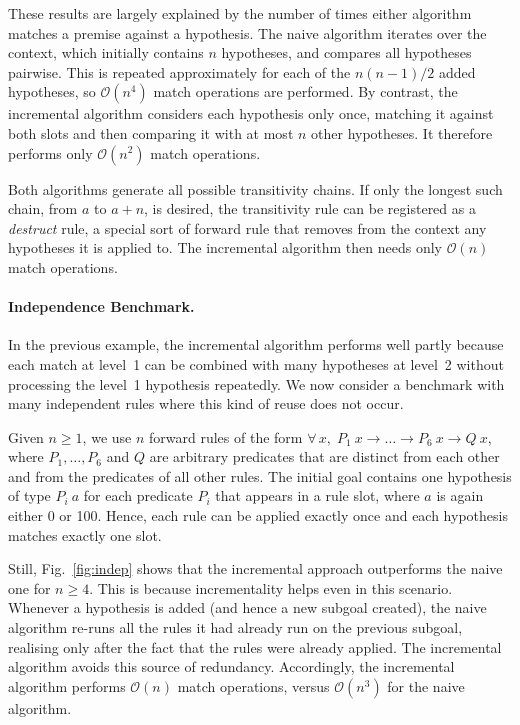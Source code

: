 \documentclass[runningheads,leqno]{llncs}
\newcommand{\para}[1]{\paragraph{\bfseries\upshape #1}}
\newcommand{\All}[2]{\ensuremath{\forall\, #1,\; #2}}
\newcommand{\bigO}{\ensuremath{\mathcal{O}}}
\begin{document}
These results are largely explained by the number of times either algorithm matches a premise against a hypothesis.
The naive algorithm iterates over the context, which initially contains $n$ hypotheses, and compares all hypotheses pairwise.
This is repeated approximately for each of the $n(n-1)/2$ added hypotheses, so $\bigO(n^4)$ match operations are performed.
By contrast, the incremental algorithm considers each hypothesis only once, matching it against both slots and then comparing it with at most $n$ other hypotheses.
It therefore performs only $\bigO(n^2)$ match operations.

Both algorithms generate all possible transitivity chains.
If only the longest such chain, from $a$ to $a + n$, is desired, the transitivity rule can be registered as a \emph{destruct} rule, a special sort of forward rule that removes from the context any hypotheses it is applied to.
The incremental algorithm then needs only $\bigO(n)$ match operations.

\para{Independence Benchmark.}
In the previous example, the incremental algorithm performs well partly because each match at level~1 can be combined with many hypotheses at level~2 without processing the level~1 hypothesis repeatedly.
We now consider a benchmark with many independent rules where this kind of reuse does not occur.

Given $n ≥ 1$, we use $n$ forward rules of the form $\All{x}{P_{1}~x → \dots → P_{6}~x → Q~x}$, where $P_{1}, \dots, P_{6}$ and $Q$ are arbitrary predicates that are distinct from each other and from the predicates of all other rules.
The initial goal contains one hypothesis of type $P_{i}~a$ for each predicate $P_{i}$ that appears in a rule slot, where $a$ is again either 0 or 100.
Hence, each rule can be applied exactly once and each hypothesis matches exactly one slot.

Still, Fig.~\ref{fig:indep} shows that the incremental approach outperforms the naive one for $n ≥ 4$.
This is because incrementality helps even in this scenario.
Whenever a hypothesis is added (and hence a new subgoal created), the naive algorithm re-runs all the rules it had already run on the previous subgoal, realising only after the fact that the rules were already applied.
The incremental algorithm avoids this source of redundancy.
Accordingly, the incremental algorithm performs $\bigO(n)$ match operations, versus $\bigO(n^3)$ for the naive algorithm.
\end{document}
